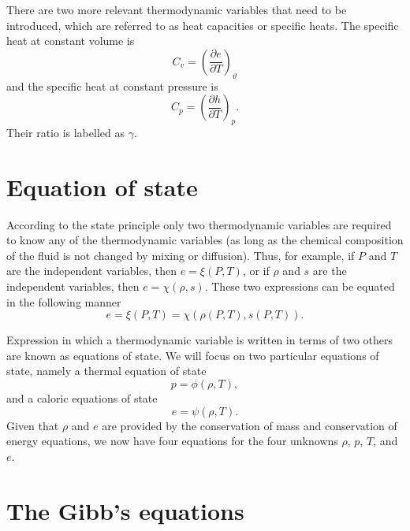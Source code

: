 \documentclass[oneside,a4paper,11pt]{report}
\begin{document}
There are two more relevant thermodynamic variables that need to be introduced, which are referred to as heat capacities or specific heats. The specific heat at constant volume is
\begin{equation}
    C_v = \left( \frac{\partial e}{\partial T} \right)_\vartheta
\end{equation}
and the specific heat at constant pressure is
\begin{equation}
    C_p = \left ( \frac{\partial h}{\partial T} \right)_p.
\end{equation}
Their ratio is labelled as $\gamma$.

\section{Equation of state}
\label{sec:eos}
According to the state principle only two thermodynamic variables are required to know any of the thermodynamic variables (as long as the chemical composition of the fluid is not changed by mixing or diffusion). Thus, for example, if $P$ and $T$ are the independent variables, then $e = \xi(P,T)$, or if $\rho$ and $s$ are the independent variables, then $e = \chi(\rho,s)$. These two expressions can be equated in the following manner
\begin{equation}
\label{eq:state_principle}
    e = \xi(P,T) = \chi(\rho(P,T), s(P,T)).
\end{equation}

Expression in which a thermodynamic variable is written in terms of two others are known as equations of state. We will focus on two particular equations of state, namely a thermal equation of state
\begin{equation}
\label{eq:thermal_eos}
    p = \phi(\rho,T),
\end{equation}
and a caloric equations of state 
\begin{equation}
\label{eq:caloric_eos}
    e =\psi(\rho,T).
\end{equation}
Given that $\rho$ and $e$ are provided by the conservation of mass and conservation of energy equations, we now have four equations for the four unknowns $\rho$, $p$, $T$, and $e$.

\section{The Gibb's equations}
\end{document}

